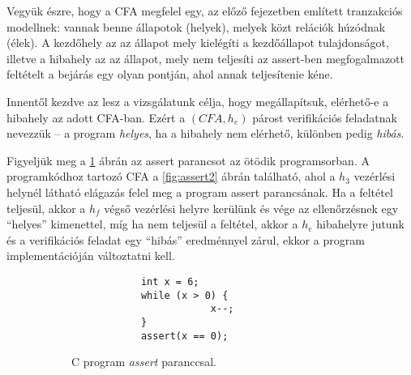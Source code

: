 Vegyük észre, hogy a CFA megfelel egy, az előző fejezetben említett tranzakciós modellnek: vannak benne állapotok (helyek), melyek közt relációk húzódnak (élek). A kezdőhely az az állapot mely kielégíti a kezdőállapot tulajdonságot, illetve a hibahely az az állapot, mely nem teljesíti az assert-ben megfogalmazott feltételt a bejárás egy olyan pontján, ahol annak teljesítenie kéne.

Innentől kezdve az lesz a vizsgálatunk célja, hogy megállapítsuk, elérhető-e a hibahely az adott CFA-ban. Ezért a $(\mathit{CFA}, h_e)$ párost verifikációs feladatnak nevezzük -- a program \emph{helyes}, ha a hibahely nem elérhető, különben pedig \emph{hibás}.

\begin{example}
	Figyeljük meg a \ref{fig:assert1} ábrán az assert parancsot az ötödik programsorban. A programkódhoz tartozó CFA a \ref{fig:assert2} ábrán található, ahol a $h_3$ vezérlési helynél látható elágazás felel meg a program assert parancsának. Ha a feltétel teljesül, akkor a $h_f$ végső vezérlési helyre kerülünk és vége az ellenőrzésnek egy ``helyes'' kimenettel, míg ha nem teljesül a feltétel, akkor a $h_e$ hibahelyre jutunk és a verifikációs feladat egy ``hibás'' eredménnyel zárul, ekkor a program implementációján változtatni kell.
	\begin{figure}[!htb]
		\begin{subfigure}[b]{.43\linewidth}
			\begin{lstlisting}
			int x = 6;
			while (x > 0) {
						x--;
			}
			assert(x == 0);\end{lstlisting}
			\caption{C program \emph{assert} paranccsal.}
			\label{fig:assert1}		
		\end{subfigure}	
		\hfill
		\begin{subfigure}[b]{.56\linewidth}
			\centering
\end{subfigure}
\end{figure}
\end{example}
